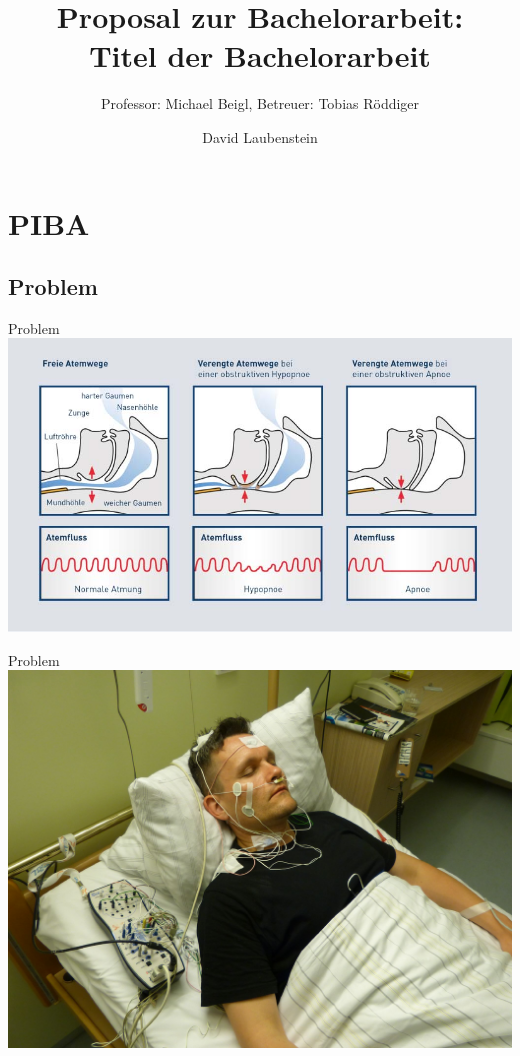 \documentclass[18pt]{beamer}
\title[Proposal Bachelorarbeit]{Proposal zur Bachelorarbeit:\\ Titel der Bachelorarbeit}
\subtitle{Professor: Michael Beigl, Betreuer: Tobias Röddiger}
\author{David Laubenstein}
\institute{Lehrstuhl Pervasive Computing Systems}
\begin{document}

\begin{frame}
\titlepage
\end{frame}


\section{PIBA}
\subsection{Problem}
\begin{frame}{Problem}
    \includegraphics[scale=0.4]{logos/was-passiert-bei-schlafapnoe}
\end{frame}

\begin{frame}{Problem}
    \includegraphics[scale=0.12]{logos/sleepLabor}
\end{frame}
\end{document}
